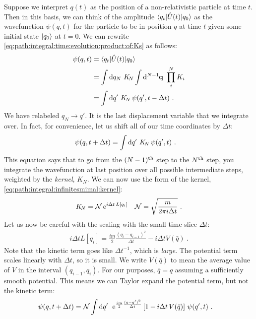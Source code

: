 \documentclass[12pt, oneside]{report}    %
\begin{document}
Suppose we interpret $q(t)$ as the position of a non-relativistic particle at time $t$. Then in this basis, we can think of the amplitude $\la q_t | \hat U(t) | q_0 \ra$ as the wavefunction $\psi(q, t)$ for the particle to be in position $q$ at time $t$ given some initial state $\ket{q_0}$ at $t=0$. We can rewrite \eqref{eq:path:integral:time:evolution:product:of:Ks} as follows:
\begin{align}
    \psi(q,t) &= \la q_t | \hat U(t) | q_0 \ra 
    \\&= \int \D{q_N} \, K_{\!N} \int \D[N-1]{\vec{q}} \,
    \prod_i^{N} K_i 
    \\
    &= \int \D{q'} \, K_{\!N}\, \psi(q',t-\Delta t) \ .
\end{align}
We have relabeled $q_N \to q'$. It is the last displacement variable that we integrate over. In fact, for convenience, let us shift all of our time coordinates by $\Delta t$: 
\begin{align}
    \psi(q,t+\Delta t) 
    &= \int \D{q'} \, K_{\!N}\, \psi(q',t) \ .
\end{align}
This equation says that to go from the $(N-1)^\textnormal{th}$ step to the $N^\textnormal{th}$ step, you integrate the wavefunction at last position over all possible intermediate steps, weighted by the \emph{kernel}, $K_N$. We can now use the form of the kernel, \eqref{eq:path:integral:infinitesmimal:kernel}:
\begin{align}
    K_{\!N} &= \mathcal N \e^{i\Delta t\, L[q_i]}
    &
    \mathcal N = \sqrt{\frac{m}{2\pi i \Delta t}} \ .
    \label{eq:path:integral:normalization}
\end{align}
Let us now be careful with the scaling with the small time slice $\Delta t$:
\begin{align}
    i\Delta t L[q_i] = \frac{im}{2}\frac{(q_i-q_{i-1})^2}{\Delta t} - i\Delta t V(\bar q) \ .
\end{align}
Note that the kinetic term goes like $\Delta t^{-1}$, which is \emph{large}. The potential term scales linearly with $\Delta t$, so it is small. We write $V(\bar q)$ to mean the average value of $V$ in the interval $(q_{i-1}, q_i)$. For our purposes, $\bar q = q$ assuming a sufficiently smooth potential. This means we can Taylor expand the potential term, but not the kinetic term:
\begin{align}
    \psi(q,t+\Delta t) &= \mathcal N\int \D{q'}\; 
    \e^{\frac{im}{2}\frac{(q-q')^2}{\Delta t}} 
    \left[1 - i\Delta t \, V(\bar q)\right]\,
    \psi(q',t) \ .
\end{align}
\end{document}
